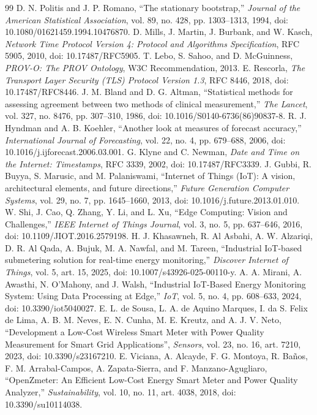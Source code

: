 \documentclass[technologies,article,submit,pdftex,moreauthors]{Definitions/mdpi}
\begin{document}
\begin{thebibliography}{99}
 D. N. Politis and J. P. Romano, ``The stationary bootstrap,'' \emph{Journal of the American Statistical Association}, vol. 89, no. 428, pp. 1303--1313, 1994, doi: 10.1080/01621459.1994.10476870.
 D. Mills, J. Martin, J. Burbank, and W. Kasch, \emph{Network Time Protocol Version 4: Protocol and Algorithms Specification}, RFC 5905, 2010, doi: 10.17487/RFC5905.
 T. Lebo, S. Sahoo, and D. McGuinness, \emph{PROV-O: The PROV Ontology}, W3C Recommendation, 2013.
 E. Rescorla, \emph{The Transport Layer Security (TLS) Protocol Version 1.3}, RFC 8446, 2018, doi: 10.17487/RFC8446.
 J. M. Bland and D. G. Altman, ``Statistical methods for assessing agreement between two methods of clinical measurement,'' \emph{The Lancet}, vol. 327, no. 8476, pp. 307--310, 1986, doi: 10.1016/S0140-6736(86)90837-8.
 R. J. Hyndman and A. B. Koehler, ``Another look at measures of forecast accuracy,'' \emph{International Journal of Forecasting}, vol. 22, no. 4, pp. 679--688, 2006, doi: 10.1016/j.ijforecast.2006.03.001.
 G. Klyne and C. Newman, \emph{Date and Time on the Internet: Timestamps}, RFC 3339, 2002, doi: 10.17487/RFC3339.
 J. Gubbi, R. Buyya, S. Marusic, and M. Palaniswami, ``Internet of Things (IoT): A vision, architectural elements, and future directions,'' \emph{Future Generation Computer Systems}, vol. 29, no. 7, pp. 1645--1660, 2013, doi: 10.1016/j.future.2013.01.010.
 W. Shi, J. Cao, Q. Zhang, Y. Li, and L. Xu, ``Edge Computing: Vision and Challenges,'' \emph{IEEE Internet of Things Journal}, vol. 3, no. 5, pp. 637--646, 2016, doi: 10.1109/JIOT.2016.2579198.
 H. J. Khasawneh, R. Al Asbahi, A. W. Alzariqi, D. R. Al Qada, A. Bujuk, M. A. Nawfal, and M. Tareen, ``Industrial IoT-based submetering solution for real-time energy monitoring,'' \emph{Discover Internet of Things}, vol. 5, art. 15, 2025, doi: 10.1007/s43926-025-00110-y.
 A. A. Mirani, A. Awasthi, N. O'Mahony, and J. Walsh, ``Industrial IoT-Based Energy Monitoring System: Using Data Processing at Edge,'' \emph{IoT}, vol. 5, no. 4, pp. 608--633, 2024, doi: 10.3390/iot5040027.
 E. L. de Sousa, L. A. de Aquino Marques, I. da S. Felix de Lima, A. B. M. Neves, E. N. Cunha, M. E. Kreutz, and A. J. V. Neto, ``Development a Low-Cost Wireless Smart Meter with Power Quality Measurement for Smart Grid Applications'', \emph{Sensors}, vol. 23, no. 16, art. 7210, 2023, doi: 10.3390/s23167210.
 E. Viciana, A. Alcayde, F. G. Montoya, R. Ba\~nos, F. M. Arrabal-Campos, A. Zapata-Sierra, and F. Manzano-Agugliaro, ``OpenZmeter: An Efficient Low-Cost Energy Smart Meter and Power Quality Analyzer,'' \emph{Sustainability}, vol. 10, no. 11, art. 4038, 2018, doi: 10.3390/su10114038.

\end{thebibliography}
\end{document}
